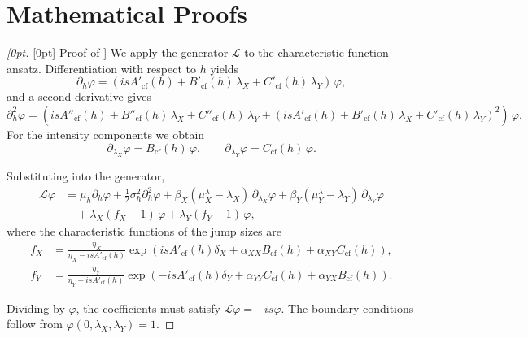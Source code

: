 \documentclass{article}
\theoremstyle{definition}
\newenvironment{delayedproof}[1]
 {\begin{proof}[\raisedtarget{#1}Proof of \Cref{#1}]}
 {\end{proof}}
\newcommand{\raisedtarget}[1]{%
  \raisebox{\fontcharht\font`P}[0pt][0pt]{\hypertarget{#1}{}}%
}
\begin{document}
\section{Mathematical Proofs}
\label{sec:proofs}

\begin{delayedproof}{prop:cf_riccati}
We apply the generator $\mathcal{L}$ to the characteristic function ansatz. Differentiation with respect to $h$ yields
\[
\partial_h \varphi 
= \left( i s A'_{\text{cf}}(h) + B'_{\text{cf}}(h)\,\lambda_X + C'_{\text{cf}}(h)\,\lambda_Y \right)\,\varphi,
\]
and a second derivative gives
\[
\partial_h^2 \varphi 
= \left( i s A''_{\text{cf}}(h) + B''_{\text{cf}}(h)\,\lambda_X + C''_{\text{cf}}(h)\,\lambda_Y 
+ \left(i s A'_{\text{cf}}(h) + B'_{\text{cf}}(h)\,\lambda_X + C'_{\text{cf}}(h)\,\lambda_Y\right)^2 \right)\,\varphi.
\]
For the intensity components we obtain
\[
\partial_{\lambda_X}\varphi = B_{\text{cf}}(h)\,\varphi, 
\qquad 
\partial_{\lambda_Y}\varphi = C_{\text{cf}}(h)\,\varphi.
\]

Substituting into the generator,
\[
\begin{aligned}
\mathcal{L}\varphi &= 
\mu_h \partial_h \varphi 
+ \frac{1}{2}\sigma_h^2 \partial_h^2 \varphi
+ \beta_X(\mu_X^\lambda - \lambda_X)\,\partial_{\lambda_X}\varphi
+ \beta_Y(\mu_Y^\lambda - \lambda_Y)\,\partial_{\lambda_Y}\varphi \\
&\quad + \lambda_X(f_X - 1)\,\varphi + \lambda_Y(f_Y - 1)\,\varphi,
\end{aligned}
\]
where the characteristic functions of the jump sizes are
\[
\begin{aligned}
f_X &= \frac{\eta_X}{\eta_X - i s A'_{\text{cf}}(h)} 
\exp\!\left( i s A'_{\text{cf}}(h)\delta_X + \alpha_{XX} B_{\text{cf}}(h) + \alpha_{XY} C_{\text{cf}}(h) \right), \\
f_Y &= \frac{\eta_Y}{\eta_Y + i s A'_{\text{cf}}(h)} 
\exp\!\left( -i s A'_{\text{cf}}(h)\delta_Y + \alpha_{YY} C_{\text{cf}}(h) + \alpha_{YX} B_{\text{cf}}(h) \right).
\end{aligned}
\]

Dividing by $\varphi$, the coefficients must satisfy $\mathcal{L}\varphi = -i s \varphi$. The boundary conditions follow from $\varphi(0, \lambda_X, \lambda_Y) = 1$.
\end{delayedproof}
\end{document}
